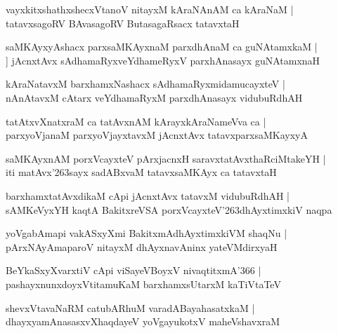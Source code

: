 \documentclass[twoside,12pt,openright]{book}
\def\S{\char'263}
\newcounter{shloka}[chapter]
\begin{document}
\begin{shloka}%
vayxkitxshathxshecxVtanoV nitayxM kAraNAnAM ca kAraNaM |\\
tatavxsagoRV BAvasagoRV ButasagaRsacx tatavxtaH 
\end{shloka}

\begin{shloka}%
saMKAyxyAshacx parxsaMKAyxnaM parxdhAnaM ca guNAtamxkaM |\\]
jAcnxtAvx sAdhamaRyxveYdhameRyxV parxhAnasayx guNAtamxnaH 
\end{shloka}

\begin{shloka}%
kAraNatavxM barxhamxNashacx sAdhamaRyxmidamucayxteV |\\
nAnAtavxM cAtarx veYdhamaRyxM parxdhAnasayx vidubuRdhAH 
\end{shloka}

\begin{shloka}%
tatAtxvXnatxraM ca tatAvxnAM kArayxkAraNameVva ca |\\
parxyoVjanaM parxyoVjayxtavxM jAcnxtAvx tatavxparxsaMKayxyA 
\end{shloka}

\begin{shloka}%
saMKAyxnAM porxVcayxteV pArxjacnxH saravxtatAvxthaRciMtakeYH |\\
iti matAvx\S sayx sadABxvaM tatavxsaMKAyx ca tatavxtaH 
\end{shloka}

\begin{shloka}%
barxhamxtatAvxdikaM cApi jAcnxtAvx tatavxM vidubuRdhAH |\\
sAMKeVyxYH kaqtA BakitxreVSA porxVcayxteV\S dhAyxtimxkiV naqpa 
\end{shloka}

\begin{shloka}%
yoVgabAmapi vakASxyXmi BakitxmAdhAyxtimxkiVM shaqNu |\\
pArxNAyAmaparoV nitayxM dhAyxnavAninx yateVMdirxyaH 
\end{shloka}

\begin{shloka}%
BeYkaSxyXvarxtiV cApi viSayeVBoyxV nivaqtitxmA\char'366 |\\
pashayxnunxdoyxVtitamuKaM barxhamxsUtarxM kaTiVtaTeV 
\end{shloka}

\begin{shloka}%
shevxVtavaNaRM catubARhuM varadABayahasatxkaM |\\
dhayxyamAnasasxvXhaqdayeV yoVgayukotxV maheVshavxraM 
\end{shloka}
\end{document}
